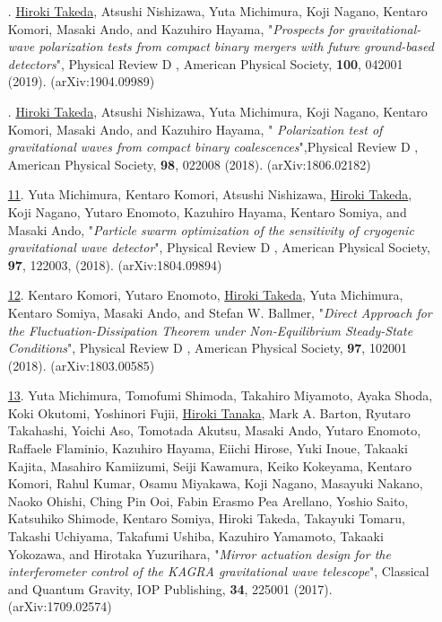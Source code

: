 \documentclass[uplatex, 12pt]{article}
\newcommand{\ctext}[1]{\ooalign{
\hfil\resizebox{\width}{\height}{#1}\hfil
\crcr
\raise.2mm\hbox{\large$\bigcirc$}}}
\begin{document}
\begin{enumerate}
\item[\uline{\ctext{9}}.] \uline{Hiroki Takeda}, Atsushi Nishizawa, Yuta Michimura, Koji Nagano, Kentaro Komori, Masaki Ando, and Kazuhiro Hayama, "\emph{Prospects for gravitational-wave polarization tests from compact binary mergers with future ground-based detectors}", Physical Review D , American Physical Society, {\bf 100}, 042001 (2019). (arXiv:1904.09989)\\

\item[\uline{\ctext{10}}.] \uline{Hiroki Takeda}, Atsushi Nishizawa, Yuta Michimura, Koji Nagano, Kentaro Komori, Masaki Ando, and Kazuhiro Hayama, " \emph{Polarization test of gravitational waves from compact binary coalescences}",Physical Review D , American Physical Society, {\bf 98}, 022008 (2018). (arXiv:1806.02182)\\

\item[\uline{11}.] Yuta Michimura, Kentaro Komori, Atsushi Nishizawa, \uline{Hiroki Takeda}, Koji Nagano, Yutaro Enomoto, Kazuhiro Hayama, Kentaro Somiya, and Masaki Ando, "\emph{Particle swarm optimization of the sensitivity of cryogenic gravitational wave detector}", Physical Review D , American Physical Society, {\bf 97}, 122003, (2018). (arXiv:1804.09894)\\

\item[\uline{12}.] Kentaro Komori, Yutaro Enomoto, \uline{Hiroki Takeda}, Yuta Michimura, Kentaro Somiya, Masaki Ando, and Stefan W. Ballmer, "\emph{Direct Approach for the Fluctuation-Dissipation Theorem under Non-Equilibrium Steady-State Conditions}", Physical Review D , American Physical Society, {\bf 97}, 102001 (2018). (arXiv:1803.00585)\\

\item[\uline{13}.] Yuta Michimura, Tomofumi Shimoda, Takahiro Miyamoto, Ayaka Shoda, Koki Okutomi, Yoshinori Fujii, \uline{Hiroki Tanaka}, Mark A. Barton, Ryutaro Takahashi, Yoichi Aso, Tomotada Akutsu, Masaki Ando, Yutaro Enomoto, Raffaele Flaminio, Kazuhiro Hayama, Eiichi Hirose, Yuki Inoue, Takaaki Kajita, Masahiro Kamiizumi, Seiji Kawamura, Keiko Kokeyama, Kentaro Komori, Rahul Kumar, Osamu Miyakawa, Koji Nagano, Masayuki Nakano, Naoko Ohishi, Ching Pin Ooi, Fabin Erasmo Pea Arellano, Yoshio Saito, Katsuhiko Shimode, Kentaro Somiya, Hiroki Takeda, Takayuki Tomaru, Takashi Uchiyama, Takafumi Ushiba, Kazuhiro Yamamoto, Takaaki Yokozawa, and Hirotaka Yuzurihara, "\emph{Mirror actuation design for the interferometer control of the KAGRA gravitational wave telescope}", Classical and Quantum Gravity, IOP Publishing, {\bf 34}, 225001 (2017). (arXiv:1709.02574)
\end{enumerate}
\end{document}

